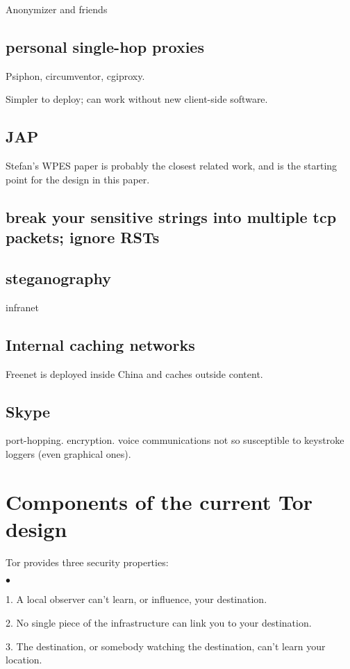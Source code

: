 \documentclass{llncs}
\newenvironment{tightlist}{\begin{list}{$\bullet$}{
  \setlength{\itemsep}{0mm}
    \setlength{\parsep}{0mm}
    }}{\end{list}}
\begin{document}
Anonymizer and friends

\subsection{personal single-hop proxies}

Psiphon, circumventor, cgiproxy.

Simpler to deploy; can work without new client-side software.

\subsection{JAP}

Stefan's WPES paper is probably the closest related work, and is
the starting point for the design in this paper.

\subsection{break your sensitive strings into multiple tcp packets;
ignore RSTs}

\subsection{steganography}

infranet

\subsection{Internal caching networks}

Freenet is deployed inside China and caches outside content.

\subsection{Skype}

port-hopping. encryption. voice communications not so susceptible to
keystroke loggers (even graphical ones).

\section{Components of the current Tor design}

Tor provides three security properties:
\begin{tightlist}
\item 1. A local observer can't learn, or influence, your destination.
\item 2. No single piece of the infrastructure can link you to your
destination.
\item 3. The destination, or somebody watching the destination,
can't learn your location.
\end{tightlist}
\end{document}
